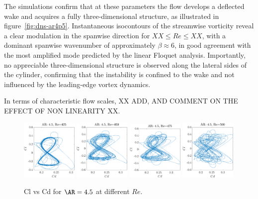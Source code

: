 The simulations confirm that at these parameters the flow develops a deflected wake and acquires a fully three-dimensional structure, as illustrated in figure~\ref{fig:dns-ar4p5}. Instantaneous isocontours of the streamwise vorticity reveal a clear modulation in the spanwise direction for $ XX \le Re \le XX $, with a dominant spanwise wavenumber of approximately $\beta \approx 6$, in good agreement with the most amplified mode predicted by the linear Floquet analysis. Importantly, no appreciable three-dimensional structure is observed along the lateral sides of the cylinder, confirming that the instability is confined to the wake and not influenced by the leading-edge vortex dynamics.

In terms of characteristic flow scales, XX ADD, AND COMMENT ON THE EFFECT OF NON LINEARITY XX.
\begin{figure}
  \centering
  \includegraphics[width=0.24\textwidth]{./fig/nnl/ClCdAR4.5RE425.png}
  \includegraphics[width=0.24\textwidth]{./fig/nnl/ClCdAR4.5RE450.png}
  \includegraphics[width=0.24\textwidth]{./fig/nnl/ClCdAR4.5RE475.png}
  \includegraphics[width=0.24\textwidth]{./fig/nnl/ClCdAR4.5RE500.png}
  \caption{Cl vs Cd for $\AR=4.5$ at different $Re$.}
  \label{fig:ClCd}
\end{figure}

